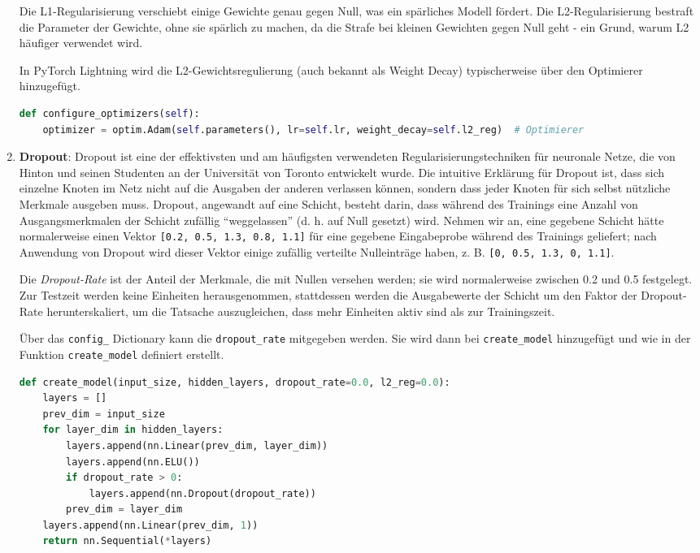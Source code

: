 \documentclass[11pt,a4paper,headinclude]{scrartcl}
\begin{document}
\begin{Aufgabe}
\begin{enumerate}
		Die L1-Regularisierung verschiebt einige Gewichte genau gegen Null, was ein spärliches Modell fördert. Die L2-Regularisierung bestraft die Parameter der Gewichte, ohne sie spärlich zu machen, da die Strafe bei kleinen Gewichten gegen Null geht - ein Grund, warum L2 häufiger verwendet wird.
		
		In PyTorch Lightning wird die L2-Gewichtsregulierung (auch bekannt als Weight Decay) typischerweise über den Optimierer hinzugefügt.
		
		\begin{lstlisting}[language=Python]
def configure_optimizers(self):
	optimizer = optim.Adam(self.parameters(), lr=self.lr, weight_decay=self.l2_reg)  # Optimierer
		\end{lstlisting}
		
		
		\item \textbf{Dropout}: Dropout ist eine der effektivsten und am häufigsten verwendeten Regularisierungstechniken für neuronale Netze, die von Hinton und seinen Studenten an der Universität von Toronto entwickelt wurde. Die intuitive Erklärung für Dropout ist, dass sich einzelne Knoten im Netz nicht auf die Ausgaben der anderen verlassen können, sondern dass jeder Knoten für sich selbst nützliche Merkmale ausgeben muss. 
		Dropout, angewandt auf eine Schicht, besteht darin, dass während des Trainings eine Anzahl von Ausgangsmerkmalen der Schicht zufällig "`weggelassen"' (d. h. auf Null gesetzt) wird. Nehmen wir an, eine gegebene Schicht hätte normalerweise einen Vektor \texttt{[0.2, 0.5, 1.3, 0.8, 1.1]} für eine gegebene Eingabeprobe während des Trainings geliefert; nach Anwendung von Dropout wird dieser Vektor einige zufällig verteilte Nulleinträge haben, z. B. \texttt{[0, 0.5, 1.3, 0, 1.1]}.
		
		Die \emph{Dropout-Rate} ist der Anteil der Merkmale, die mit Nullen versehen werden; sie wird normalerweise zwischen 0.2 und 0.5 festgelegt. Zur Testzeit werden keine Einheiten herausgenommen, stattdessen werden die Ausgabewerte der Schicht um den Faktor der Dropout-Rate herunterskaliert, um die Tatsache auszugleichen, dass mehr Einheiten aktiv sind als zur Trainingszeit. 
		
		Über das \texttt{config\_} Dictionary kann die \texttt{dropout\_rate} mitgegeben werden. Sie wird dann bei \texttt{create\_model} hinzugefügt und wie in der Funktion \texttt{create\_model} definiert erstellt.
		
		\begin{lstlisting}[language=Python]
def create_model(input_size, hidden_layers, dropout_rate=0.0, l2_reg=0.0):
	layers = []
	prev_dim = input_size
	for layer_dim in hidden_layers:
		layers.append(nn.Linear(prev_dim, layer_dim))
		layers.append(nn.ELU())
		if dropout_rate > 0:
			layers.append(nn.Dropout(dropout_rate))
		prev_dim = layer_dim
	layers.append(nn.Linear(prev_dim, 1))
	return nn.Sequential(*layers)
		\end{lstlisting}
		

\end{enumerate}
\end{Aufgabe}
\end{document}
